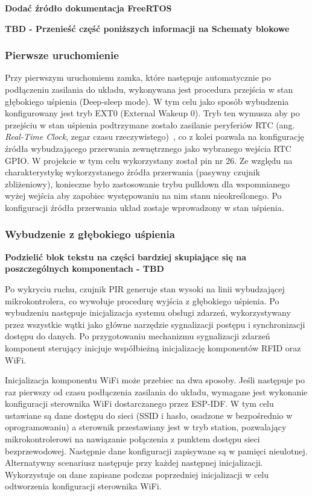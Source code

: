                 \textbf{Dodać źródło dokumentacja FreeRTOS}

            \textbf{TBD - Przenieść część poniższych informacji na Schematy blokowe}

            \subsubsection{Pierwsze uruchomienie}

                Przy pierwszym uruchomienu zamka, które następuje automatycznie po podłączeniu zasilania do układu, wykonywana jest procedura przejścia w stan głębokiego uśpienia (Deep-sleep mode). W tym celu jako sposób wybudzenia konfigurowany jest tryb EXT0 (External Wakeup 0). Tryb ten wymusza aby po przejściu w stan uśpienia podtrzymane zostało zasilanie peryferiów RTC (ang. \textit{Real-Time Clock}, zegar czasu rzeczywistego)~\cite{esp32-api-ref-deep-sleep}, co z kolei pozwala na konfigurację źródła wybudzającego przerwania zewnętrznego jako wybranego wejścia RTC GPIO. W projekcie w tym celu wykorzystany został pin nr 26. Ze względu na charakterystykę wykorzystanego źródła przerwania (pasywny czujnik zbliżeniowy), konieczne było zastosowanie trybu pulldown dla wspomnianego wyżej wejścia aby zapobiec występowaniu na nim stanu nieokreślonego. Po konfiguracji źródła przerwania układ zostaje wprowadzony w stan uśpienia.

            \subsubsection{Wybudzenie z głębokiego uśpienia}

                \textbf{Podzielić blok tekstu na części bardziej skupiające się na poszczególnych komponentach - TBD}

                Po wykryciu ruchu, czujnik PIR generuje stan wysoki na linii wybudzającej mikrokontrolera, co wywołuje procedurę wyjścia z głębokiego uśpienia. Po wybudzeniu następuje inicjalizacja systemu obsługi zdarzeń, wykorzystywany przez wszystkie wątki jako główne narzędzie sygnalizacji postępu i synchronizacji dostępu do danych. Po przygotowaniu mechanizmu sygnalizacji zdarzeń komponent sterujący inicjuje współbieżną inicjalizację komponentów RFID oraz WiFi.

                Inicjalizacja komponentu WiFi może przebiec na dwa sposoby. Jeśli następuje po raz pierwszy od czasu podłączenia zasilania do układu, wymagane jest wykonanie konfiguracji sterownika WiFi dostarczanego przez ESP-IDF. W tym celu ustawiane są dane dostępu do sieci (SSID i hasło, osadzone w bezpośrednio w oprogramowaniu) a sterownik przestawiany jest w tryb station, pozwalający mikrokontrolerowi na nawiązanie połączenia z punktem dostępu sieci bezprzewodowej. Następnie dane konfiguracji zapisywane są w pamięci nieulotnej. Alternatywny scenariusz następuje przy każdej następnej inicjalizacji. Wykorzystuje on dane zapisane podczas poprzedniej inicjalizacji w celu odtworzenia konfiguracji sterownika WiFi.

